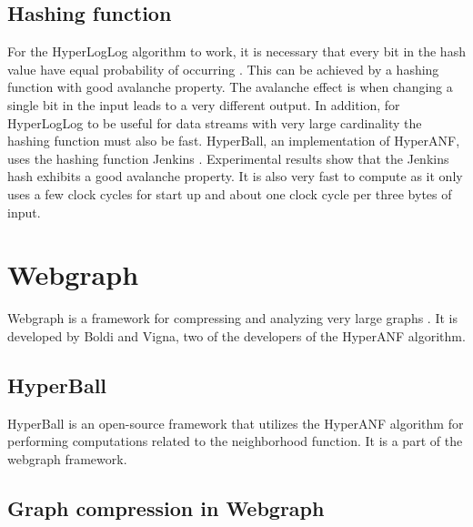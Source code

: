 \subsection{Hashing function}
For the HyperLogLog algorithm to work, it is necessary that every bit in the hash value have equal probability of occurring \cite{hyperloglog}. This can be achieved by a hashing function with good avalanche property. The avalanche effect is when changing a single bit in the input leads to a very different output. In addition, for HyperLogLog to be useful for data streams with very large cardinality the hashing function must also be fast. HyperBall, an implementation of HyperANF, uses the hashing function Jenkins \cite{webgraph}. Experimental results show that the Jenkins hash exhibits a good avalanche property. It is also very fast to compute as it only uses a few clock cycles for start up and about one clock cycle per three bytes of input.

\iffalse
\subsection{BroadWord}
Broadword is a way to do several calculations at the same time using cleverly constructed binary-logic expressions. HyperANF uses broadword to take the union $U$ of two HyperLogLog counters $A$ and $B$, which effectively is taking $\forall i; U_i = max(A_i,B_i)$
\fi

\section{Webgraph}
Webgraph is a framework for compressing and analyzing very large graphs \cite{webgraph}. It is developed by Boldi and Vigna, two of the developers of the HyperANF algorithm.


\subsection{HyperBall}
HyperBall is an open-source framework that utilizes the HyperANF algorithm for performing computations related to the neighborhood function. It is a part of the webgraph framework.

\subsection{Graph compression in Webgraph}
\label{sec:Compression}

